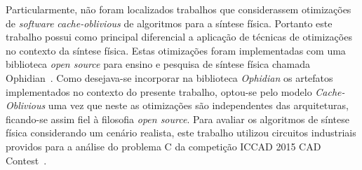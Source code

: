Particularmente, não foram localizados trabalhos que considerassem otimizações de \textit{software} \textit{cache-oblivious} de algoritmos para a síntese física.
Portanto este trabalho possui como principal diferencial a aplicação de técnicas de otimizações no contexto da síntese física.
Estas otimizações foram implementadas com uma biblioteca \textit{open source} para ensino e pesquisa de síntese física chamada Ophidian~\cite{ophidian}.
Como desejava-se incorporar na biblioteca \textit{Ophidian} os artefatos implementados no contexto do presente trabalho, optou-se pelo modelo \textit{Cache-Oblivious}
uma vez que neste as otimizações são independentes das arquiteturas, ficando-se assim fiel à filosofia \textit{open source}. 
Para avaliar os algoritmos de síntese física considerando um cenário realista, este trabalho utilizou circuitos industriais providos para a análise do problema C da competição ICCAD 2015 CAD Contest~\cite{kim2015}.
